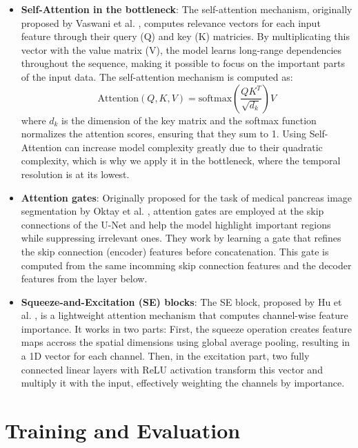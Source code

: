\begin{itemize}
    \item \textbf{Self-Attention in the bottleneck}: The self-attention mechanism, originally proposed by Vaswani et al. \cite{vaswani2017attention}, computes relevance vectors for each input feature through their query (Q) and key (K) matricies. By multiplicating this vector with the value matrix (V), the model learns long-range dependencies throughout the sequence, making it possible to focus on the important parts of the input data. The self-attention mechanism is computed as:
    \begin{equation}
        \text{Attention}(Q, K, V) = \text{softmax}\left(\frac{QK^T}{\sqrt{d_k}}\right)V
    \end{equation}
    where $d_k$ is the dimension of the key matrix and the softmax function normalizes the attention scores, ensuring that they sum to 1.
    Using Self-Attention can increase model complexity greatly due to their quadratic complexity, which is why we apply it in the bottleneck, where the temporal resolution is at its lowest.
    \item \textbf{Attention gates}: Originally proposed for the task of medical pancreas image segmentation by Oktay et al. \cite{oktay2018attention}, attention gates are employed at the skip connections of the U-Net and help the model highlight important regions while suppressing irrelevant ones. They work by learning a gate that refines the skip connection (encoder) features before concatenation. This gate is computed from the same incomming skip connection features and the decoder features from the layer below. 
    \item \textbf{Squeeze-and-Excitation (SE) blocks}: The SE block, proposed by Hu et al. \cite{hu2018squeeze}, is a lightweight attention mechanism that computes channel-wise feature importance. It works in two parts: First, the squeeze operation creates feature maps accross the spatial dimensions using global average pooling, resulting in a 1D vector for each channel. Then, in the excitation part, two fully connected linear layers with ReLU activation transform this vector and multiply it with the input, effectively weighting the channels by importance. 
\end{itemize}


\section{Training and Evaluation}

